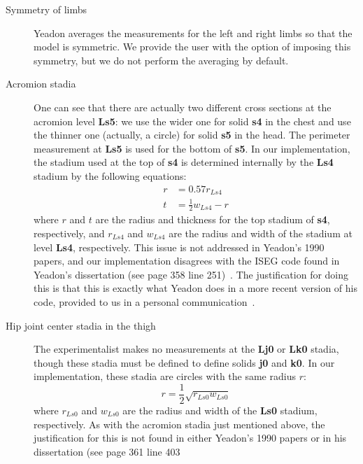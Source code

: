 \documentclass[10pt]{article}
\begin{document}
\begin{description}
    \item[Symmetry of limbs] Yeadon averages the measurements for the left and
        right limbs so that the model is symmetric. We provide the user with
        the option of imposing this symmetry, but we do not perform the
        averaging by default.
    \item[Acromion stadia] One can see that there are actually two different
        cross sections at the acromion level \textbf{Ls5}: we use the wider one
        for solid \textbf{s4} in the chest and use the thinner one (actually, a
        circle) for solid \textbf{s5} in the head. The perimeter measurement at
        \textbf{Ls5} is used for the bottom of \textbf{s5}. In our
        implementation, the stadium used at the top of \textbf{s4} is
        determined internally by the \textbf{Ls4} stadium by the following
        equations:
        \begin{align}
            r &= 0.57 r_{Ls4} \\
            t &= \frac{1}{2}w_{Ls4} - r
        \end{align}
        where $r$ and $t$ are the radius and thickness for the top stadium of
        \textbf{s4}, respectively, and $r_{Ls4}$ and $w_{Ls4}$ are the radius
        and width of the stadium at level \textbf{Ls4}, respectively.
        This issue is not addressed in Yeadon's 1990 papers, and our
        implementation disagrees with the ISEG code found in Yeadon's
        dissertation (see page 358 line 251)~\cite{Yeadon1984a}. The
        justification for doing this is that this is exactly what Yeadon does
        in a more recent version of his code, provided to us in a personal
        communication~\cite{Yeadon2011}.
    \item[Hip joint center stadia in the thigh] The experimentalist makes no
        measurements at the \textbf{Lj0} or \textbf{Lk0} stadia, though these
        stadia must be defined to define solids \textbf{j0} and \textbf{k0}. In
        our implementation, these stadia are circles with the same radius $r$:
        \begin{equation}
            r = \frac{1}{2}\sqrt{r_{Ls0} w_{Ls0}}
        \end{equation}
        where $r_{Ls0}$ and $w_{Ls0}$ are the radius and width of the
        \textbf{Ls0} stadium, respectively. As with the acromion stadia just
        mentioned above, the justification for this is not found in either
        Yeadon's 1990 papers or in his dissertation (see page 361 line 403

\end{description}
\end{document}

